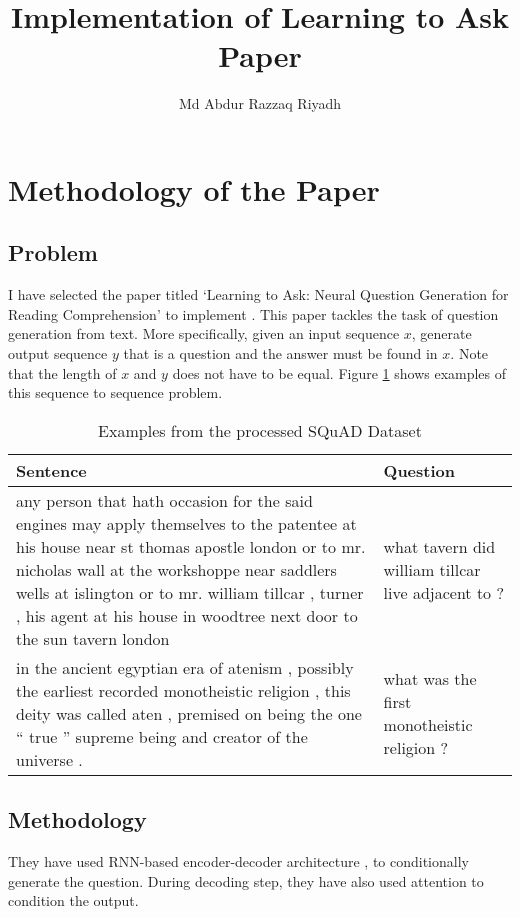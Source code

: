 \documentclass{article}
\title{Implementation of Learning to Ask Paper}
\author{Md Abdur Razzaq Riyadh}
\begin{document}
	\maketitle
	
	\section{Methodology of the Paper}
	\subsection{Problem}
	I have selected the paper titled `Learning to Ask: Neural Question Generation for Reading Comprehension' to implement \cite{du2017learning}. 
	This paper tackles the task of question generation from text. 
	More specifically, given an input sequence $x$, generate output sequence $y$ that is a question and the answer must be found in $x$.
	Note that the length of $x$ and $y$ does not have to be equal. Figure \ref{fig:example} shows examples of this sequence to sequence problem.
	
	\begin{table}[h!]
		\centering	
		\begin{tabular}{ m{25em} m{10em}}
			Sentence & Question \\
			\hline
			any person that hath occasion for the said engines may apply themselves to the patentee at his house near st thomas apostle london or to mr. nicholas wall at the workshoppe near saddlers wells at islington or to mr. william tillcar , turner , his agent at his house in woodtree next door to the sun tavern london & what tavern did william tillcar live adjacent to ? \\
			\hline
			in the ancient egyptian era of atenism , possibly the earliest recorded monotheistic religion , this deity was called aten , premised on being the one `` true '' supreme being and creator of the universe . & what was the first monotheistic religion ?
			
		\end{tabular}
		\caption{Examples from the processed SQuAD Dataset}
		\label{fig:example}
	\end{table}
	
	\subsection{Methodology}
	They have used RNN-based encoder-decoder architecture \citep{bahdanau2014neural},\citep{cho-etal-2014-learning} to conditionally generate the question. During decoding step, they have also used attention \citep{luong2015effective} to condition the output. 
	
\end{document}
